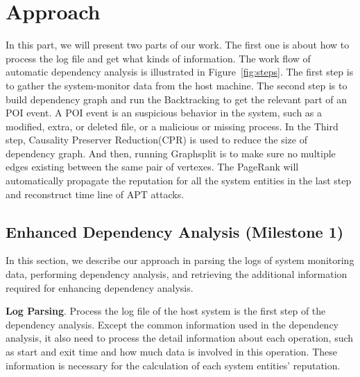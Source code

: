 


\section{Approach}
In this part, we will present two parts of our work. The first one is about how to process the log file and get what kinds of information. The work flow of automatic dependency analysis is illustrated in Figure~\ref{fig:steps}. The first step is to gather the system-monitor data from the host machine. The second step is to build dependency graph and run the Backtracking to get the relevant part of an POI event\cite{xu2016high}. A POI event is an suspicious behavior in the system, such as a modified, extra, or deleted file, or a malicious or missing process. In the Third step, 
Causality Preserver Reduction(CPR)  is used to reduce the size of dependency graph. And then, running Graphsplit is to make sure no multiple edges existing between the same pair of vertexes. The PageRank will automatically propagate the reputation for all the system entities in the last step and reconstruct time line of APT attacks.


\subsection{Enhanced Dependency Analysis (Milestone 1)}
In this section, we describe our approach in parsing the logs of system monitoring data, performing dependency analysis, and retrieving the additional information required for enhancing dependency analysis.

\textbf{Log Parsing}.
Process the log file of the host system is the first step of the dependency analysis. Except the common information used in the dependency analysis, it also need to process the detail information about each operation, such as start and exit time and how much data is involved in this operation. These information is necessary for the calculation of each system entities' reputation.

